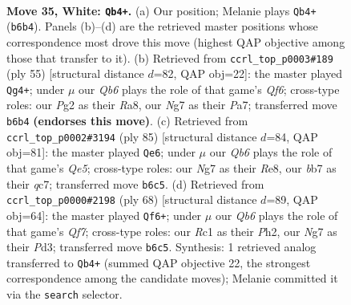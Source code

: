 \documentclass[11pt]{article}
\begin{document}
\clearpage

\begin{figure}[p]\centering
\begin{subfigure}{0.46\textwidth}\centering
\resizebox{\linewidth}{!}{%
\newchessgame
\chessboard[
  setfen={6nr/1b1qk1N1/1Q6/r3P3/7p/3B3P/1p4P1/2R3KR w - - 2 35},
  showmover=false,
  pgfstyle=straightmove, color=movearrow, markmove={b6-b4}
]}
\caption{}
\end{subfigure}\hfill
\begin{subfigure}{0.46\textwidth}\centering
\resizebox{\linewidth}{!}{%
\newchessgame
\chessboard[
  setfen={r5k1/p7/5R1p/2p2pp1/b2P4/B4q1N/P6P/1Q2R1K1 b - - 5 28},
  showmover=false,
  pgfstyle=straightmove, color=movearrow, markmove={f3-g4}
]}
\caption{}
\end{subfigure}
\\[4pt]
\begin{subfigure}{0.46\textwidth}\centering
\resizebox{\linewidth}{!}{%
\newchessgame
\chessboard[
  setfen={4r2k/2Q3pr/1p3p2/p4N1p/3Bq2P/5R2/PP3K2/8 b - - 1 43},
  showmover=false,
  pgfstyle=straightmove, color=movearrow, markmove={e4-e6}
]}
\caption{}
\end{subfigure}\hfill
\begin{subfigure}{0.46\textwidth}\centering
\resizebox{\linewidth}{!}{%
\newchessgame
\chessboard[
  setfen={6rk/1b3Q2/1q2N2b/4p1p1/p7/P2P4/6PP/5R1K w - - 2 35},
  showmover=false,
  pgfstyle=straightmove, color=movearrow, markmove={f7-f6}
]}
\caption{}
\end{subfigure}
\caption{\textbf{Move 35, White: \texttt{Qb4+}.} (a) Our position; Melanie plays \texttt{Qb4+} (\texttt{b6b4}). Panels (b)--(d) are the retrieved master positions whose correspondence most drove this move (highest QAP objective among those that transfer to it). (b) Retrieved from \texttt{ccrl\_top\_p0003\#189} (ply 55) [structural distance $d$=82, QAP obj=22]: the master played \texttt{Qg4+}; under $\mu$ our \emph{Qb6} plays the role of that game's \emph{Qf6}; cross-type roles: our \emph{P}g2 as their \emph{R}a8, our \emph{N}g7 as their \emph{P}a7; transferred move \texttt{b6b4} \textbf{(endorses this move)}. (c) Retrieved from \texttt{ccrl\_top\_p0002\#3194} (ply 85) [structural distance $d$=84, QAP obj=81]: the master played \texttt{Qe6}; under $\mu$ our \emph{Qb6} plays the role of that game's \emph{Qe5}; cross-type roles: our \emph{N}g7 as their \emph{R}e8, our \emph{b}b7 as their \emph{q}c7; transferred move \texttt{b6c5}. (d) Retrieved from \texttt{ccrl\_top\_p0000\#2198} (ply 68) [structural distance $d$=89, QAP obj=64]: the master played \texttt{Qf6+}; under $\mu$ our \emph{Qb6} plays the role of that game's \emph{Qf7}; cross-type roles: our \emph{R}c1 as their \emph{P}h2, our \emph{N}g7 as their \emph{P}d3; transferred move \texttt{b6c5}. Synthesis: 1 retrieved analog transferred to \texttt{Qb4+} (summed QAP objective 22, the strongest correspondence among the candidate moves); Melanie committed it via the \texttt{search} selector.}
\label{fig:thought-m68}
\end{figure}
\end{document}
